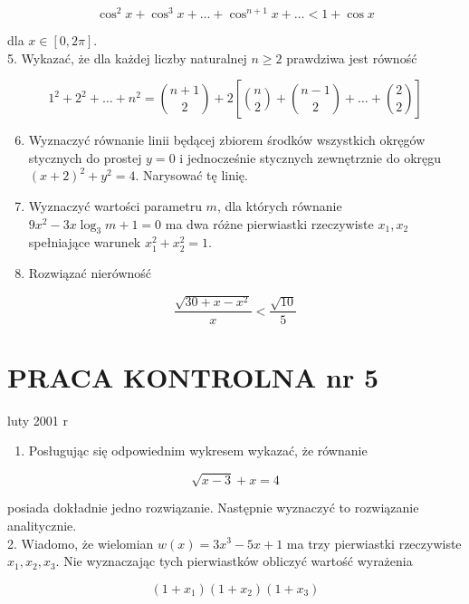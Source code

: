 \documentclass[10pt]{article}
\begin{document}
$$
\cos ^{2} x+\cos ^{3} x+\ldots+\cos ^{n+1} x+\ldots<1+\cos x
$$

dla $x \in[0,2 \pi]$.\\
5. Wykazać, że dla każdej liczby naturalnej $n \geqslant 2$ prawdziwa jest równość

$$
1^{2}+2^{2}+\ldots+n^{2}=\binom{n+1}{2}+2\left[\binom{n}{2}+\binom{n-1}{2}+\ldots+\binom{2}{2}\right]
$$

\begin{enumerate}
  \setcounter{enumi}{5}
  \item Wyznaczyć równanie linii będącej zbiorem środków wszystkich okręgów stycznych do prostej $y=0$ i jednocześnie stycznych zewnętrznie do okręgu $(x+2)^{2}+y^{2}=4$. Narysować tę linię.
  \item Wyznaczyć wartości parametru $m$, dla których równanie $9 x^{2}-3 x \log _{3} m+1=0$ ma dwa różne pierwiastki rzeczywiste $x_{1}, x_{2}$ spełniające warunek $x_{1}^{2}+x_{2}^{2}=1$.
  \item Rozwiązać nierówność
\end{enumerate}

$$
\frac{\sqrt{30+x-x^{2}}}{x}<\frac{\sqrt{10}}{5}
$$

\section*{PRACA KONTROLNA nr 5}
luty 2001 r

\begin{enumerate}
  \item Posługując się odpowiednim wykresem wykazać, że równanie
\end{enumerate}

$$
\sqrt{x-3}+x=4
$$

posiada dokładnie jedno rozwiązanie. Następnie wyznaczyć to rozwiązanie analitycznie.\\
2. Wiadomo, że wielomian $w(x)=3 x^{3}-5 x+1$ ma trzy pierwiastki rzeczywiste $x_{1}, x_{2}, x_{3}$. Nie wyznaczając tych pierwiastków obliczyć wartość wyrażenia

$$
\left(1+x_{1}\right)\left(1+x_{2}\right)\left(1+x_{3}\right)
$$
\end{document}
